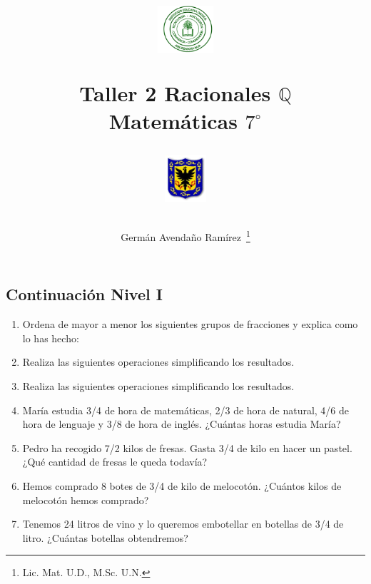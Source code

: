 \documentclass[10pt,twoside]{article}
\author{Germ\'an Avenda\~no Ram\'irez~\thanks{Lic. Mat. U.D., M.Sc. U.N.}}
\title{\begin{minipage}{.2\textwidth}
\includegraphics[height=1.75cm]{Images/logo-colegio.png}\end{minipage}
\begin{minipage}{.55\textwidth}
\begin{center}
Taller 2 Racionales $\mathbb{Q}$\\
Matemáticas $7^{\circ}$
\end{center}
\end{minipage}\hfill
\begin{minipage}{.2\textwidth}
\includegraphics[height=1.75cm]{Images/logo-sed.png} 
\end{minipage}}
\date{}
\begin{document}
\maketitle
\subsection*{Continuación Nivel I}
\begin{enumerate}
\item Ordena de mayor a menor los siguientes grupos de fracciones y explica como lo has hecho:
\begin{enumerate}
\end{enumerate}
\item Realiza las siguientes operaciones simplificando los resultados.
\begin{enumerate}
\end{enumerate}
\item Realiza las siguientes operaciones simplificando los resultados.
\begin{enumerate}
\end{enumerate}
\item María estudia 3/4 de hora de matemáticas, 2/3 de hora de natural, 4/6 de hora de lenguaje y 3/8 de hora de inglés. ¿Cuántas horas estudia María?
\item Pedro ha recogido 7/2 kilos de fresas. Gasta 3/4 de kilo en hacer un pastel. ¿Qué cantidad de fresas le queda todavía?
\item Hemos comprado 8 botes de 3/4 de kilo de melocotón. ¿Cuántos kilos de melocotón hemos comprado?
\item Tenemos 24 litros de vino y lo queremos embotellar en botellas de 3/4 de litro. ¿Cuántas botellas obtendremos?
\end{enumerate}
\end{document}
